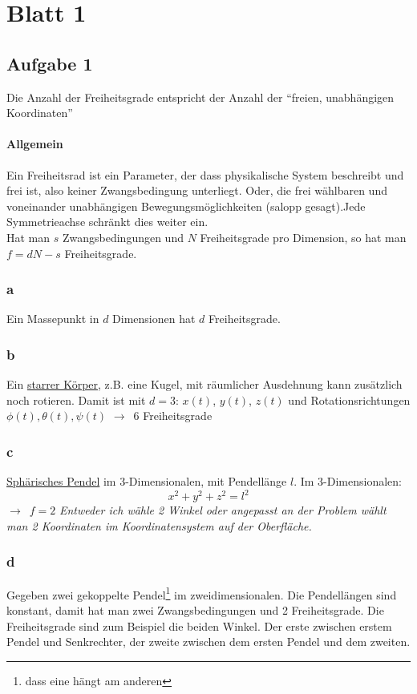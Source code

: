 \documentclass[oneside]{book}
\theoremstyle{definition}
\newcommand{\conseq}{$\rightarrow$~}
\begin{document}
\section{Blatt 1}

\subsection{Aufgabe 1}
Die Anzahl der Freiheitsgrade entspricht der Anzahl der "`freien, unabhängigen Koordinaten"'

\paragraph{Allgemein} Ein Freiheitsrad ist ein Parameter, der dass physikalische System beschreibt und frei ist, also keiner Zwangsbedingung unterliegt. Oder, die frei wählbaren und voneinander unabhängigen Bewegungsmöglichkeiten (salopp gesagt).Jede Symmetrieachse schränkt dies weiter ein.\\

Hat man $s$ Zwangsbedingungen und $N$ Freiheitsgrade pro Dimension, so hat man $f = d N - s$ Freiheitsgrade.

\subsubsection{a}
Ein Massepunkt in $d$ Dimensionen hat $d$ Freiheitsgrade.

\subsubsection{b}
Ein \href{https://de.wikipedia.org/wiki/Starrer_K\%C3\%B6rper}{starrer Körper}, z.B. eine Kugel, mit räumlicher Ausdehnung kann zusätzlich noch rotieren. Damit ist mit $d = 3$: $x(t)$, $y(t)$, $z(t)$ und Rotationsrichtungen $\phi(t), \theta(t), \psi(t)$ \conseq 6 Freiheitsgrade

\subsubsection{c}
\href{http://de.wikipedia.org/wiki/Sph\%C3\%A4risches_Pendel}{Sphärisches Pendel} im 3-Dimensionalen, mit Pendellänge $l$. Im 3-Dimensionalen:
$$x^2 + y^2 + z^2 = l^2$$
\conseq $f = 2$ \textit{Entweder ich wähle 2 Winkel oder angepasst an der Problem wählt man 2 Koordinaten im Koordinatensystem auf der Oberfläche.}

\subsubsection{d}
Gegeben zwei gekoppelte Pendel\footnote{dass eine hängt am anderen} im zweidimensionalen. Die Pendellängen sind konstant, damit hat man zwei Zwangsbedingungen und 2 Freiheitsgrade. Die Freiheitsgrade sind zum Beispiel die beiden Winkel. Der erste zwischen erstem Pendel und Senkrechter, der zweite zwischen dem ersten Pendel und dem zweiten.
\end{document}
